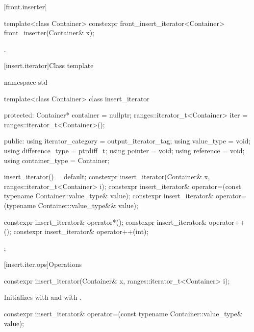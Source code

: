 [front.inserter]{}

%
\begin{itemdecl}
template<class Container>
  constexpr front_insert_iterator<Container> front_inserter(Container& x);
\end{itemdecl}

\begin{itemdescr}
\pnum
\returns
{}.
\end{itemdescr}

[insert.iterator]{Class template }

%
\begin{codeblock}
namespace std {
  template<class Container>
  class insert_iterator {
  protected:
    Container* container = nullptr;
    ranges::iterator_t<Container> iter = ranges::iterator_t<Container>();

  public:
    using iterator_category = output_iterator_tag;
    using value_type        = void;
    using difference_type   = ptrdiff_t;
    using pointer           = void;
    using reference         = void;
    using container_type    = Container;

    insert_iterator() = default;
    constexpr insert_iterator(Container& x, ranges::iterator_t<Container> i);
    constexpr insert_iterator& operator=(const typename Container::value_type& value);
    constexpr insert_iterator& operator=(typename Container::value_type&& value);

    constexpr insert_iterator& operator*();
    constexpr insert_iterator& operator++();
    constexpr insert_iterator& operator++(int);
  };
}
\end{codeblock}

[insert.iter.ops]{Operations}

%
\begin{itemdecl}
constexpr insert_iterator(Container& x, ranges::iterator_t<Container> i);
\end{itemdecl}

\begin{itemdescr}
\pnum
\effects
Initializes
with  and
with .
\end{itemdescr}

%
\begin{itemdecl}
constexpr insert_iterator& operator=(const typename Container::value_type& value);
\end{itemdecl}

